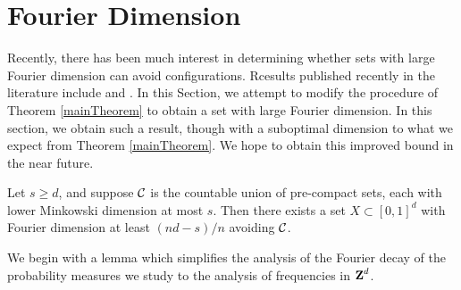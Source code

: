 \section{Fourier Dimension}

Recently, there has been much interest in determining whether sets with large Fourier dimension can avoid configurations. Rcesults published recently in the literature include \cite{PramanikLaba} and \cite{Shmerkin}. In this Section, we attempt to modify the procedure of Theorem \ref{mainTheorem} to obtain a set with large Fourier dimension. In this section, we obtain such a result, though with a suboptimal dimension to what we expect from Theorem \ref{mainTheorem}. We hope to obtain this improved bound in the near future.

\begin{theorem} \label{FourierTheorem}
    Let $s \geq d$, and suppose $\operatorname{\mathcal{C}}$ is the countable union of pre-compact sets, each with lower Minkowski dimension at most $s$. Then there exists a set $X \subset [0,1]^d$ with Fourier dimension at least $(nd - s)/n$ avoiding $\operatorname{\mathcal{C}}$.
\end{theorem}

We begin with a lemma which simplifies the analysis of the Fourier decay of the probability measures we study to the analysis of frequencies in $\operatorname{\mathbf{Z}}^d$.

